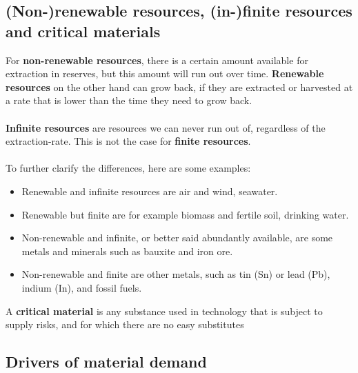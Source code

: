 \documentclass[../summary.tex]{subfiles}
\begin{document}
\subsection{(Non-)renewable resources, (in-)finite resources and critical materials}

For \textbf{non-renewable resources}, there is a certain amount available for extraction in reserves, but this amount will run out over time. \textbf{Renewable resources} on the other hand can grow back, if they are extracted or harvested at a rate that is lower than the time they need to grow back.
\\\\
\textbf{Infinite resources} are resources we can never run out of, regardless of the extraction-rate. This is not the case for \textbf{finite resources}.
\\\\
To further clarify the differences, here are some examples:
\begin{itemize}
	\setlength{\itemsep}{0pt}
	\item Renewable and infinite resources are air and wind, seawater.
	\item Renewable but finite are for example biomass and fertile soil, drinking water.
	\item Non-renewable and infinite, or better said abundantly available, are some metals and minerals such as bauxite and iron ore.
	\item Non-renewable and finite are other metals, such as tin (Sn) or lead (Pb), indium (In), and fossil fuels.
\end{itemize}
A \textbf{critical material} is any substance used in technology that is subject to supply risks, and for which there are no easy substitutes

\subsection{Drivers of material demand}
\end{document}
